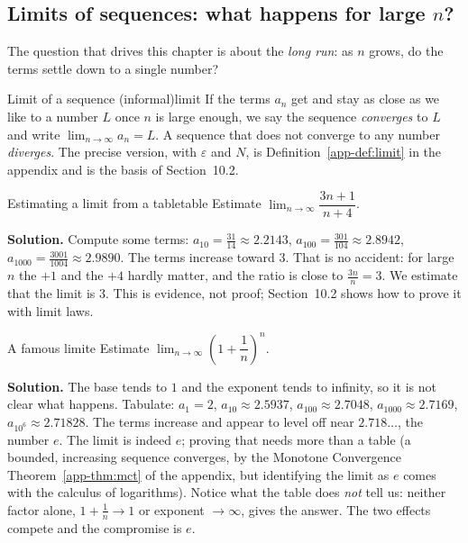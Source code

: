 \documentclass[11pt]{article}
\begin{document}
\subsection*{Limits of sequences: what happens for large $n$?}

The question that drives this chapter is about the \emph{long run}: as $n$ grows, do the terms settle down to a single number?

\begin{defn}{Limit of a sequence (informal)}{limit}
If the terms $a_n$ get and stay as close as we like to a number $L$ once $n$ is large enough, we say the sequence \emph{converges} to $L$ and write $\lim_{n\to\infty}a_n=L$. A sequence that does not converge to any number \emph{diverges}. The precise version, with $\varepsilon$ and $N$, is Definition~\ref{app-def:limit} in the appendix and is the basis of Section~10.2.
\end{defn}

\begin{exmp}{Estimating a limit from a table}{table}
Estimate $\lim_{n\to\infty}\dfrac{3n+1}{n+4}$.

\textbf{Solution.} Compute some terms: $a_{10}=\frac{31}{14}\approx2.2143$, $a_{100}=\frac{301}{104}\approx2.8942$, $a_{1000}=\frac{3001}{1004}\approx2.9890$. The terms increase toward $3$. That is no accident: for large $n$ the $+1$ and the $+4$ hardly matter, and the ratio is close to $\frac{3n}{n}=3$.
We estimate that the limit is $3$. This is evidence, not proof; Section~10.2 shows how to prove it with limit laws.
\end{exmp}

\begin{exmp}{A famous limit}{e}
Estimate $\lim_{n\to\infty}\left(1+\dfrac1n\right)^n$.

\textbf{Solution.} The base tends to $1$ and the exponent tends to infinity, so it is not clear what happens. Tabulate: $a_1=2$, $a_{10}\approx2.5937$, $a_{100}\approx2.7048$, $a_{1000}\approx2.7169$, $a_{10^6}\approx2.71828$.
The terms increase and appear to level off near $2.718\ldots$, the number $e$. The limit is indeed $e$; proving that needs more than a table (a bounded, increasing sequence converges, by the Monotone Convergence Theorem~\ref{app-thm:mct} of the appendix, but identifying the limit as $e$ comes with the calculus of logarithms). Notice what the table does \emph{not} tell us: neither factor alone, $1+\frac1n\to1$ or exponent $\to\infty$, gives the answer. The two effects compete and the compromise is $e$.
\end{exmp}
\end{document}
